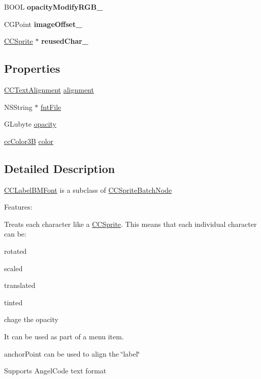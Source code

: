 \begin{DoxyCompactItemize}
\item 
\hypertarget{interface_c_c_label_b_m_font_a31fa1f433c1e30eb48d5f0b872a14d56}{B\-O\-O\-L {\bfseries opacity\-Modify\-R\-G\-B\-\_\-}}\label{interface_c_c_label_b_m_font_a31fa1f433c1e30eb48d5f0b872a14d56}

\item 
\hypertarget{interface_c_c_label_b_m_font_adb9afdfe78a618e36328fa5f64d3214d}{C\-G\-Point {\bfseries image\-Offset\-\_\-}}\label{interface_c_c_label_b_m_font_adb9afdfe78a618e36328fa5f64d3214d}

\item 
\hypertarget{interface_c_c_label_b_m_font_a2639fe41a6fd1cb6395015171713eaee}{\hyperlink{class_c_c_sprite}{C\-C\-Sprite} $\ast$ {\bfseries reused\-Char\-\_\-}}\label{interface_c_c_label_b_m_font_a2639fe41a6fd1cb6395015171713eaee}

\end{DoxyCompactItemize}
\subsection*{Properties}
\begin{DoxyCompactItemize}
\item 
\hyperlink{cc_types_8h_aa56b958f0cc9bdec20a15ed6bea3d0f1}{C\-C\-Text\-Alignment} \hyperlink{interface_c_c_label_b_m_font_a09044cb69cc77f6a9c2eca4be57145ad}{alignment}
\item 
N\-S\-String $\ast$ \hyperlink{interface_c_c_label_b_m_font_a6e9e9cb1489af865f014c740eb18681e}{fnt\-File}
\item 
G\-Lubyte \hyperlink{interface_c_c_label_b_m_font_a7be6d42174b0e4f580de73ec7a1f0d35}{opacity}
\item 
\hyperlink{cc_types_8h_a829b00c53e72f0115e3880cb508fec1e}{cc\-Color3\-B} \hyperlink{interface_c_c_label_b_m_font_ad23edd9d62b78b5f0c7844d8f5e9bb8b}{color}
\end{DoxyCompactItemize}


\subsection{Detailed Description}
\hyperlink{interface_c_c_label_b_m_font}{C\-C\-Label\-B\-M\-Font} is a subclass of \hyperlink{interface_c_c_sprite_batch_node}{C\-C\-Sprite\-Batch\-Node}

Features\-:
\begin{DoxyItemize}
\item Treats each character like a \hyperlink{class_c_c_sprite}{C\-C\-Sprite}. This means that each individual character can be\-:
\item rotated
\item scaled
\item translated
\item tinted
\item chage the opacity
\item It can be used as part of a menu item.
\item anchor\-Point can be used to align the \char`\"{}label\char`\"{}
\item Supports Angel\-Code text format
\end{DoxyItemize}

